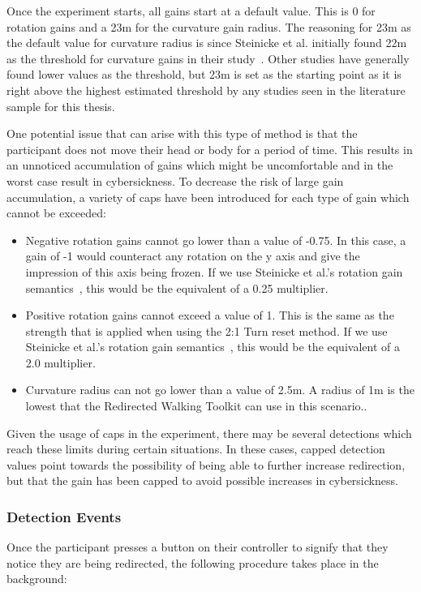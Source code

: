 Once the experiment starts, all gains start at a default value. This is 0 for rotation gains and a 23m for the curvature gain radius. The reasoning for 23m as the default value for curvature radius is since Steinicke et al. initially found 22m as the threshold for curvature gains in their study~\cite{5072212}. Other studies have generally found lower values as the threshold, but 23m is set as the starting point as it is right above the highest estimated threshold by any studies seen in the literature sample for this thesis.

One potential issue that can arise with this type of method is that the participant does not move their head or body for a period of time. This results in an unnoticed accumulation of gains which might be uncomfortable and in the worst case result in cybersickness. To decrease the risk of large gain accumulation, a variety of caps have been introduced for each type of gain which cannot be exceeded:
\begin{itemize}
    \item Negative rotation gains cannot go lower than a value of -0.75. In this case, a gain of -1 would counteract any rotation on the y axis and give the impression of this axis being frozen. If we use Steinicke et al.'s rotation gain semantics~\cite{5072212}, this would be the equivalent of a 0.25 multiplier. 
    \item Positive rotation gains cannot exceed a value of 1. This is the same as the strength that is applied when using the 2:1 Turn reset method. If we use Steinicke et al.'s rotation gain semantics~\cite{5072212}, this would be the equivalent of a 2.0 multiplier. 
    \item Curvature radius can not go lower than a value of 2.5m. A radius of 1m is the lowest that the Redirected Walking Toolkit can use in this scenario.. 
\end{itemize}

Given the usage of caps in the experiment, there may be several detections which reach these limits during certain situations. In these cases, capped detection values point towards the possibility of being able to further increase redirection, but that the gain has been capped to avoid possible increases in cybersickness.
   
\subsubsection{Detection Events}
Once the participant presses a button on their controller to signify that they notice they are being redirected, the following procedure takes place in the background:

